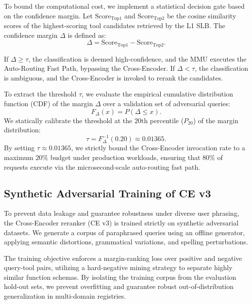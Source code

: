 To bound the computational cost, we implement a statistical decision gate based on the confidence margin. Let $\text{Score}_{\text{Top1}}$ and $\text{Score}_{\text{Top2}}$ be the cosine similarity scores of the highest-scoring tool candidates retrieved by the L1 SLB. The confidence margin $\Delta$ is defined as:
\begin{equation}
\Delta = \text{Score}_{\text{Top1}} - \text{Score}_{\text{Top2}}.
\end{equation}

If $\Delta \ge \tau$, the classification is deemed high-confidence, and the MMU executes the Auto-Routing Fast Path, bypassing the Cross-Encoder. If $\Delta < \tau$, the classification is ambiguous, and the Cross-Encoder is invoked to rerank the candidates.

To extract the threshold $\tau$, we evaluate the empirical cumulative distribution function (CDF) of the margin $\Delta$ over a validation set of adversarial queries:
\begin{equation}
F_{\Delta}(x) = P(\Delta \le x).
\end{equation}
We statically calibrate the threshold at the $20\text{th}$ percentile ($P_{20}$) of the margin distribution:
\begin{equation}
\tau = F_{\Delta}^{-1}(0.20) \approx 0.01365.
\end{equation}
By setting $\tau \approx 0.01365$, we strictly bound the Cross-Encoder invocation rate to a maximum $20\%$ budget under production workloads, ensuring that $80\%$ of requests execute via the microsecond-scale auto-routing fast path.

\subsection{Synthetic Adversarial Training of CE v3}
To prevent data leakage and guarantee robustness under diverse user phrasing, the Cross-Encoder reranker (CE v3) is trained strictly on synthetic adversarial datasets. We generate a corpus of paraphrased queries using an offline generator, applying semantic distortions, grammatical variations, and spelling perturbations. 

The training objective enforces a margin-ranking loss over positive and negative query-tool pairs, utilizing a hard-negative mining strategy to separate highly similar function schemas. By isolating the training corpus from the evaluation hold-out sets, we prevent overfitting and guarantee robust out-of-distribution generalization in multi-domain registries.

